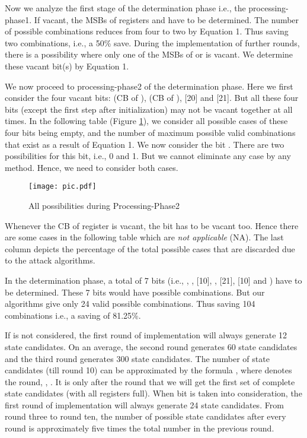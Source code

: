 \documentclass{llncs}
\begin{document}
Now we analyze the first stage of the determination phase i.e., the processing-phase1. If vacant, the MSBs of registers  and  have to be determined. The number of possible combinations reduces from four to two by Equation 1. Thus saving two combinations, i.e., a 50\% save. During the implementation of further rounds, there is a possibility where only one of the MSBs of  or  is vacant. We determine these vacant bit(s) by Equation 1.

We now proceed to processing-phase2 of the determination phase. Here we first consider the four vacant bits:  (CB of ),  (CB of ), [20] and [21]. But all these four bits (except the first step after initialization) may not be vacant together at all times. In the following table (Figure \ref{pic}), we consider all possible cases of these four bits being empty, and the number of maximum possible valid combinations that exist as a result of Equation 1. We now consider the bit . There are two possibilities for this bit, i.e., 0 and 1. But we cannot eliminate any case by any method. Hence, we need to consider both cases. 

\begin{figure}[h]
\begin{center}
\texttt{[image: pic.pdf]}
\caption{All possibilities during Processing-Phase2}
\label{pic}
\end{center}
\end{figure}

Whenever the CB of register  is vacant, the bit  has to be vacant too. Hence there are some cases in the following table which are \emph{not applicable} (NA). The last column depicts the percentage of the total possible cases that are discarded due to the attack algorithms.

In the determination phase, a total of 7 bits (i.e., , , [10], , [21], [10] and ) have to be determined. These 7 bits would have  possible combinations. But our algorithms give only 24 valid possible combinations. Thus saving 104 combinations i.e., a saving of 81.25\%. 

If  is not considered, the first round of implementation will always generate 12 state candidates. On an average, the second round generates 60 state candidates and the third round generates 300 state candidates. The number of state candidates (till round 10) can be approximated by the formula , where  denotes the  round, , . It is only after the  round that we will get the first set of complete state candidates (with all registers full). When bit  is taken into consideration, the first round of implementation will always generate 24 state candidates. From round three to round ten, the number of possible state candidates after every round is approximately five times the total number in the previous round.
\end{document}
